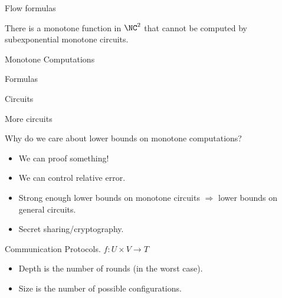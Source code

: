 \begin{frame}{Flow formulas}
    \pause

    \begin{corollary}
        There is a monotone function in $\NC^2$ that cannot be computed by subexponential monotone
        circuits.
    \end{corollary}

\end{frame}



\begin{frame}{Monotone Computations}

    \begin{minipage}{0.33\linewidth}
        \centering
        Formulas
        \vspace{0.2cm}
        
        
    \end{minipage}
    \begin{minipage}{0.33\linewidth}
        \centering
        Circuits
        \vspace{0.2cm}
        
        
    \end{minipage}
    \begin{minipage}{0.32\linewidth}
        \centering
        More circuits
        \vspace{0.2cm}
        
        
    \end{minipage}

    \pause
    Why do we care about lower bounds on monotone computations?
    \begin{itemize}
        \item We can proof something!
            \pause
        \item We can control relative error.
            \pause
        \item Strong enough lower bounds on monotone circuits $\Rightarrow$ lower bounds on general
            circuits.
            \pause
        \item Secret sharing/cryptography.
    \end{itemize}
\end{frame}


\begin{frame}{Communication Protocols. $f\colon U \times V \to T$}
    \begin{center}
    	    
    \end{center}

    \pause
    \pause
    \pause
	\pause

    \begin{itemize}
        \item Depth is the number of rounds (in the worst case).
        \item Size is the number of possible configurations.
    \end{itemize}
\end{frame}


